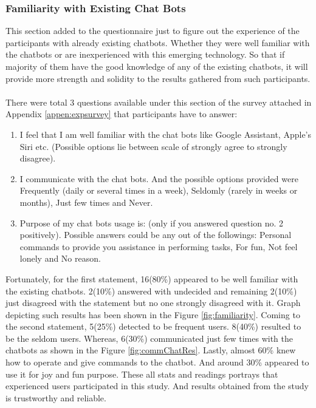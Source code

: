 \subsubsection*{Familiarity with Existing Chat Bots}
This section added to the questionnaire just to figure out the experience of the participants with already existing chatbots. Whether they were well familiar with the chatbots or are inexperienced with this emerging technology. So that if majority of them have the good knowledge of any of the existing chatbots, it will provide more strength and solidity to the results gathered from such participants.
\\~\\
There were total 3 questions available under this section of the survey attached in Appendix \ref{appen:expsurvey} that participants have to answer:
\begin{enumerate}
    \item I feel that I am well familiar with the chat bots like Google Assistant, Apple's Siri etc. (Possible options lie between scale of strongly agree to strongly disagree).
    \item I communicate with the chat bots. And the possible options provided were Frequently (daily or several times in a week), Seldomly (rarely in weeks or months), Just few times and Never.
    \item Purpose of my chat bots usage is: (only if you answered question no. 2 positively). Possible answers could be any out of the followings: Personal commands to provide you assistance in performing tasks, For fun, Not feel lonely and No reason.
\end{enumerate}
Fortunately, for the first statement, 16(80\%) appeared to be well familiar with the existing chatbots. 2(10\%) answered with undecided and remaining 2(10\%) just disagreed with the statement but no one strongly disagreed with it. Graph depicting such results has been shown in the Figure \ref{fig:familiarity}. Coming to the second statement, 5(25\%) detected to be frequent users. 8(40\%) resulted to be the seldom users. Whereas, 6(30\%) communicated just few times with the chatbots as shown in the Figure \ref{fig:commChatRes}. Lastly, almost 60\% knew how to operate and give commands to the chatbot. And around 30\% appeared to use it for joy and fun purpose. These all stats and readings portrays that experienced users participated in this study. And results obtained from the study is trustworthy and reliable. 

